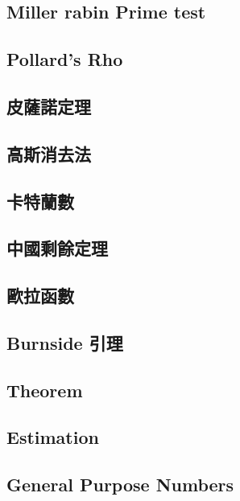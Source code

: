 \subsection{Miller rabin Prime test} 

\subsection{Pollard's Rho} 

\subsection{皮薩諾定理} 

\subsection{高斯消去法}

\subsection{卡特蘭數}

\subsection{中國剩餘定理}

\subsection{歐拉函數}

\subsection{Burnside 引理}

\subsection{Theorem}

\subsection{Estimation}

%
\subsection{General Purpose Numbers}

%

